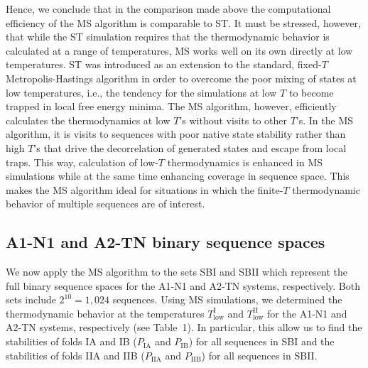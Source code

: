 \documentclass[%
 aip,
rsi,%
 amsmath,amssymb,
 reprint,%
]{revtex4-1}
\newcommand {\TlowI}     {{T^\mathrm{I}_\mathrm{low}}}
\newcommand {\TlowII}    {{T^\mathrm{II}_\mathrm{low}}}
\newcommand {\PaI}    	{{P_\mathrm{IA}}}
\newcommand {\PbI}    	{{P_\mathrm{IB}}}
\newcommand {\PaII}    	{{P_\mathrm{IIA}}}
\newcommand {\PbII}    	{{P_\mathrm{IIB}}}
\newcommand {\SI}		{{SBI}}
\newcommand {\SII}		{{SBII}}
\begin{document}
Hence, we conclude that in the comparison made above the computational efficiency of the MS algorithm is comparable to ST. It must be stressed, however, that while the ST simulation requires that the thermodynamic behavior is calculated at a range of temperatures, MS works well on its own directly at low temperatures. ST was introduced as an extension to the standard, fixed-$T$ Metropolis-Hastings algorithm in order to overcome the poor mixing of states at low temperatures, i.e., the tendency for the simulations at low $T$ to become trapped in local free energy minima. The MS algorithm, however, efficiently calculates the thermodynamics at low $T$'s without visits to other $T$'s. In the MS algorithm, it is visits to sequences with poor native state stability rather than high $T$'s that drive the decorrelation of generated states and escape from local traps. This way, calculation of low-$T$ thermodynamics is enhanced in MS simulations while at the same time enhancing coverage in sequence space. This makes the MS algorithm ideal for situations in which the finite-$T$ thermodynamic behavior of multiple sequences are of interest. 

\vspace{12pt}
\subsection{A1-N1 and A2-TN binary sequence spaces}
\noindent
We now apply the MS algorithm to the sets {\SI} and {\SII} which represent the full binary sequence spaces for the A1-N1 and A2-TN systems, respectively. Both sets include $2^{10}=1,024$ sequences. Using MS simulations, we determined the thermodynamic behavior at the temperatures $\TlowI$ and $\TlowII$ for the A1-N1 and A2-TN systems, respectively (see Table~1). In particular, this allow us to find the stabilities of folds IA and IB ($\PaI$ and $\PbI$) for all sequences in {\SI} and the stabilities of folds IIA and IIB ($\PaII$ and $\PbII$) for all sequences in {\SII}.
\end{document}
